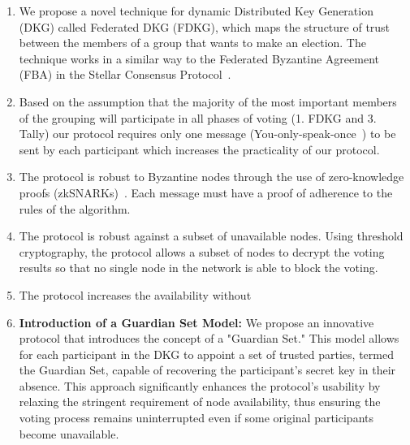 \documentclass[runningheads]{llncs}
\begin{document}
\begin{enumerate}
    \item We propose a novel technique for dynamic Distributed Key Generation (DKG) called Federated DKG (FDKG), which maps the structure of trust between the members of a group that wants to make an election. The technique works in a similar way to the Federated Byzantine Agreement (FBA) in the Stellar Consensus Protocol~\cite{mazieresStellarConsensusProtocol2015}.
    \item Based on the assumption that the majority of the most important members of the grouping will participate in all phases of voting (1. FDKG and 3. Tally) our protocol requires only one message (You-only-speak-once~\cite{gentryYOSOYouOnly2021}) to be sent by each participant which increases the practicality of our protocol.
    \item The protocol is robust to Byzantine nodes through the use of zero-knowledge proofs (zkSNARKs)~\cite{parnoPinocchioNearlyPractical2013}. Each message must have a proof of adherence to the rules of the algorithm.
    \item The protocol is robust against a subset of unavailable nodes. Using threshold cryptography, the protocol allows a subset of nodes to decrypt the voting results so that no single node in the network is able to block the voting. %
    \item The protocol increases the availability without
    
    \item \textbf{Introduction of a Guardian Set Model:} We propose an innovative protocol that introduces the concept of a "Guardian Set." This model allows for each participant in the DKG to appoint a set of trusted parties, termed the Guardian Set, capable of recovering the participant's secret key in their absence. This approach significantly enhances the protocol's usability by relaxing the stringent requirement of node availability, thus ensuring the voting process remains uninterrupted even if some original participants become unavailable.


\end{enumerate}
\end{document}
